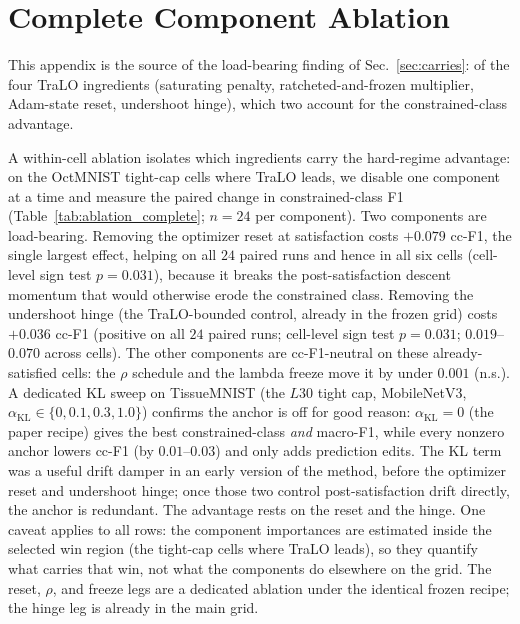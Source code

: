 \documentclass[10pt]{article}
\begin{document}
\section{Complete Component Ablation}
\label{app:ablation}

This appendix is the source of the load-bearing finding of
Sec.~\ref{sec:carries}: of the four TraLO ingredients (saturating
penalty, ratcheted-and-frozen multiplier, Adam-state reset, undershoot
hinge), which two account for the constrained-class advantage.

A within-cell ablation isolates which ingredients carry the hard-regime
advantage: on the OctMNIST tight-cap cells where TraLO leads, we disable
one component at a time and measure the paired change in
constrained-class F1 (Table~\ref{tab:ablation_complete}; $n{=}24$ per
component). Two components are load-bearing. Removing the optimizer
reset at satisfaction costs $+0.079$ cc-F1, the single largest effect,
helping on all $24$ paired runs and hence in all six cells (cell-level
sign test $p\!=\!0.031$), because it breaks the post-satisfaction
descent momentum that would otherwise erode the constrained class.
Removing the undershoot hinge (the TraLO-bounded control, already in
the frozen grid) costs $+0.036$ cc-F1 (positive on all $24$ paired
runs; cell-level sign test $p\!=\!0.031$; $0.019$--$0.070$ across cells).
The other components are cc-F1-neutral on these already-satisfied
cells: the $\rho$ schedule and the lambda freeze move it by under $0.001$
(n.s.). A dedicated KL sweep on TissueMNIST (the $L30$ tight cap,
MobileNetV3, $\alpha_{\mathrm{KL}}\!\in\!\{0,0.1,0.3,1.0\}$) confirms the
anchor is off for good reason: $\alpha_{\mathrm{KL}}{=}0$ (the paper
recipe) gives the best constrained-class \emph{and} macro-F1, while
every nonzero anchor lowers cc-F1 (by $0.01$--$0.03$) and only adds
prediction edits. The KL term was a useful drift damper in an early
version of the method, before the optimizer reset and undershoot hinge;
once those two control post-satisfaction drift directly, the anchor is
redundant. The advantage rests on the reset and the hinge. One caveat
applies to all rows: the component importances are estimated inside the
selected win region (the tight-cap cells where TraLO leads), so they
quantify what carries that win, not what the components do elsewhere on
the grid. The reset, $\rho$, and freeze legs are a dedicated ablation
under the identical frozen recipe; the hinge leg is already in the main
grid.
\end{document}
